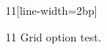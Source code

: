 \documentclass[paper=A4]{ropas-poster}
\begin{document}
\begin{postergrid}{1}{1}[line-width=2bp]
\begin{posterblock}{1}{1}
Grid option test.
\end{posterblock}
\end{postergrid}
\end{document}
